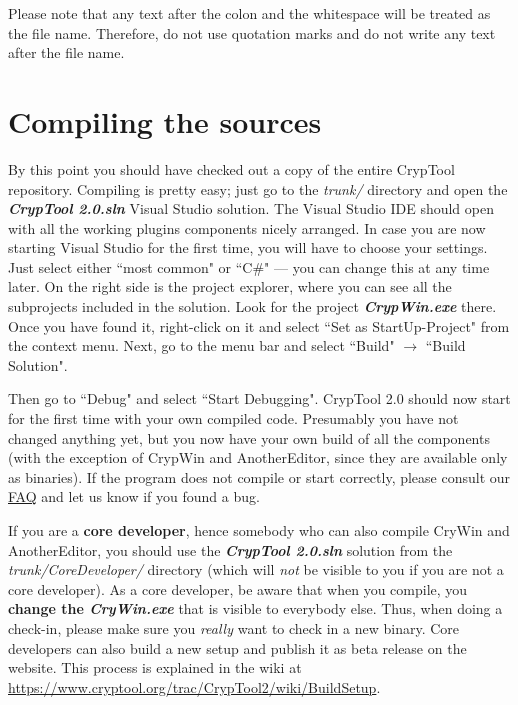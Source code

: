 \begin{center}
\end{center}

Please note that any text after the colon and the whitespace will be treated as the file name. Therefore, do not use quotation marks and do not write any text after the file name.
\clearpage

\section{Compiling the sources}
\label{CompilingTheSources}

By this point you should have checked out a copy of the entire CrypTool repository. Compiling is pretty easy; just go to the \textit{trunk/} directory and open the \textbf{\textit{CrypTool 2.0.sln}} Visual Studio solution. The Visual Studio IDE should open with all the working plugins components nicely arranged. In case you are now starting Visual Studio for the first time, you will have to choose your settings. Just select either ``most common" or ``C\#" --- you can change this at any time later. On the right side is the project explorer, where you can see all the subprojects included in the solution. Look for the project \textbf{\textit{CrypWin.exe}} there. Once you have found it, right-click on it and select ``Set as StartUp-Project" from the context menu. Next, go to the menu bar and select ``Build" $\rightarrow$ ``Build Solution".

Then go to ``Debug" and select ``Start Debugging". CrypTool 2.0 should now start for the first time with your own compiled code. Presumably you have not changed anything yet, but you now have your own build of all the components (with the exception of CrypWin and AnotherEditor, since they are available only as binaries). If the program does not compile or start correctly, please consult our \href{https://www.cryptool.org/trac/CrypTool2/wiki/FAQ}{FAQ} and let us know if you found a bug.

If you are a \textbf{core developer}, hence somebody who can also compile CryWin and AnotherEditor, you should use the \textbf{\textit{CrypTool 2.0.sln}} solution from the \textit{trunk/CoreDeveloper/} directory (which will \textit{not} be visible to you if you are not a core developer). As a core developer, be aware that when you compile, you \textbf{change the \textit{CryWin.exe}} that is visible to everybody else. Thus, when doing a check-in, please make sure you \textit{really} want to check in a new binary. Core developers can also build a new setup and publish it as beta release on the website. This process is explained in the wiki at \url{https://www.cryptool.org/trac/CrypTool2/wiki/BuildSetup}.